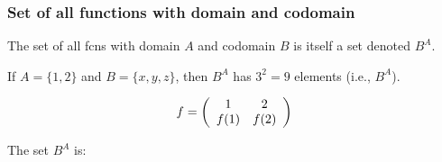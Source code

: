     \subsubsection{Set of all functions with domain and codomain}
    \begin{definition}
        The set of all fcns with domain $A$ and codomain $B$ is itself a set denoted $B^A$.
    \end{definition}

\begin{example}
    If \( A = \{1, 2\} \) and \( B = \{x, y, z\} \), then \( B^A \) has \( 3^2 = 9 \) elements (i.e., \( B^A \)).

    \[
    f = \left( \begin{array}{c c}
    1 & 2 \\
    f(1) & f(2) \\
    \end{array} \right)
    \]

    The set \( B^A \) is:


\end{example}

